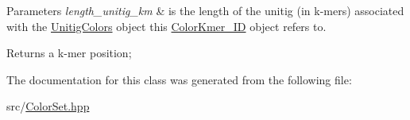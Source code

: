 \begin{DoxyParams}{Parameters}
{\em length\+\_\+unitig\+\_\+km} & is the length of the unitig (in k-\/mers) associated with the \hyperlink{classUnitigColors}{Unitig\+Colors} object this \hyperlink{classUnitigColors_1_1ColorKmer__ID}{Color\+Kmer\+\_\+\+ID} object refers to. \\
\hline
\end{DoxyParams}
\begin{DoxyReturn}{Returns}
a k-\/mer position; 
\end{DoxyReturn}


The documentation for this class was generated from the following file\+:\begin{DoxyCompactItemize}
\item 
src/\hyperlink{ColorSet_8hpp}{Color\+Set.\+hpp}\end{DoxyCompactItemize}
